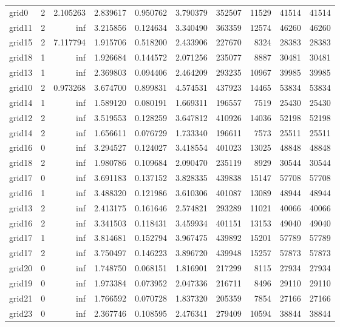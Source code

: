 \begin{longtable}{|l|r|r|r|r|r|r|r|r|r|}
grid0 & 2 & 2.105263 & 2.839617 & 0.950762 & 3.790379 & 352507 & 11529 & 41514 & 41514 \\
grid11 & 2 & inf & 3.215856 & 0.124634 & 3.340490 & 363359 & 12574 & 46260 & 46260 \\
grid15 & 2 & 7.117794 & 1.915706 & 0.518200 & 2.433906 & 227670 & 8324 & 28383 & 28383 \\
grid18 & 1 & inf & 1.926684 & 0.144572 & 2.071256 & 235077 & 8887 & 30481 & 30481 \\
grid13 & 1 & inf & 2.369803 & 0.094406 & 2.464209 & 293235 & 10967 & 39985 & 39985 \\
grid10 & 2 & 0.973268 & 3.674700 & 0.899831 & 4.574531 & 437923 & 14465 & 53834 & 53834 \\
grid14 & 1 & inf & 1.589120 & 0.080191 & 1.669311 & 196557 & 7519 & 25430 & 25430 \\
grid12 & 2 & inf & 3.519553 & 0.128259 & 3.647812 & 410926 & 14036 & 52198 & 52198 \\
grid14 & 2 & inf & 1.656611 & 0.076729 & 1.733340 & 196611 & 7573 & 25511 & 25511 \\
grid16 & 0 & inf & 3.294527 & 0.124027 & 3.418554 & 401023 & 13025 & 48848 & 48848 \\
grid18 & 2 & inf & 1.980786 & 0.109684 & 2.090470 & 235119 & 8929 & 30544 & 30544 \\
grid17 & 0 & inf & 3.691183 & 0.137152 & 3.828335 & 439838 & 15147 & 57708 & 57708 \\
grid16 & 1 & inf & 3.488320 & 0.121986 & 3.610306 & 401087 & 13089 & 48944 & 48944 \\
grid13 & 2 & inf & 2.413175 & 0.161646 & 2.574821 & 293289 & 11021 & 40066 & 40066 \\
grid16 & 2 & inf & 3.341503 & 0.118431 & 3.459934 & 401151 & 13153 & 49040 & 49040 \\
grid17 & 1 & inf & 3.814681 & 0.152794 & 3.967475 & 439892 & 15201 & 57789 & 57789 \\
grid17 & 2 & inf & 3.750497 & 0.146223 & 3.896720 & 439948 & 15257 & 57873 & 57873 \\
grid20 & 0 & inf & 1.748750 & 0.068151 & 1.816901 & 217299 & 8115 & 27934 & 27934 \\
grid19 & 0 & inf & 1.973384 & 0.073952 & 2.047336 & 216711 & 8496 & 29110 & 29110 \\
grid21 & 0 & inf & 1.766592 & 0.070728 & 1.837320 & 205359 & 7854 & 27166 & 27166 \\
grid23 & 0 & inf & 2.367746 & 0.108595 & 2.476341 & 279409 & 10594 & 38844 & 38844 \\

\end{longtable}
